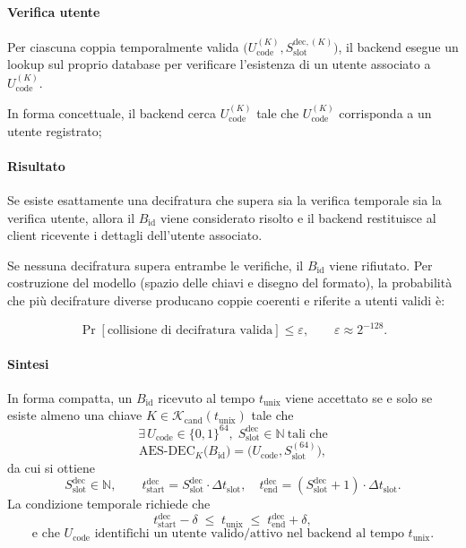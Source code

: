 \documentclass[a4paper,11pt]{article}
\begin{document}
\paragraph{Verifica utente}
Per ciascuna coppia temporalmente valida \(\bigl(U_{\text{code}}^{(K)}, S_{\text{slot}}^{\text{dec},(K)}\bigr)\), il backend esegue un lookup sul proprio database
per verificare l'esistenza di un utente associato a \(U_{\text{code}}^{(K)}\).

In forma concettuale, il backend cerca \(U_{\text{code}}^{(K)}\) tale che \(U_{\text{code}}^{(K)}\) corrisponda a un utente registrato;

\paragraph{Risultato}
Se esiste esattamente una decifratura che supera sia la verifica temporale sia la verifica utente, allora il \(B_{\text{id}}\) viene considerato
risolto e il backend restituisce al client ricevente i dettagli dell'utente associato.

Se nessuna decifratura supera entrambe le verifiche, il \(B_{\text{id}}\) viene rifiutato. Per costruzione del modello (spazio delle chiavi e
disegno del formato), la probabilità che più decifrature diverse producano coppie coerenti e riferite a utenti validi è:

\[
  \Pr[\text{collisione di decifratura valida}] \le \varepsilon,
  \qquad \varepsilon \approx 2^{-128}.
\]

\paragraph{Sintesi}
In forma compatta, un \(B_{\text{id}}\) ricevuto al tempo \(t_{\text{unix}}\) viene accettato se e solo se
esiste almeno una chiave \(K \in \mathcal{K}_{\mathrm{cand}}(t_{\text{unix}})\) tale che
\[
  \exists\, U_{\text{code}} \in \{0,1\}^{64},\;
  S_{\text{slot}}^{\text{dec}} \in \mathbb{N} \ \text{tali che}
\]
\[
  \mathrm{AES\text{-}DEC}_{K}\bigl(B_{\text{id}}\bigr)
  = \bigl(U_{\text{code}}, S_{\text{slot}}^{(64)}\bigr),
\]
da cui si ottiene
\[
  S_{\text{slot}}^{\text{dec}} \in \mathbb{N}, \qquad
  t_{\text{start}}^{\text{dec}} =
  S_{\text{slot}}^{\text{dec}} \cdot \Delta t_{\text{slot}}, \quad
  t_{\text{end}}^{\text{dec}} =
  (S_{\text{slot}}^{\text{dec}} + 1) \cdot \Delta t_{\text{slot}}.
\]
La condizione temporale richiede che
\[
  t_{\text{start}}^{\text{dec}} - \delta
  \;\le\;
  t_{\text{unix}}
  \;\le\;
  t_{\text{end}}^{\text{dec}} + \delta,
\]
\[
  \text{e che \(U_{\text{code}\!}\) identifichi un utente valido/attivo nel backend al tempo } t_{\text{unix}}.
\]
\end{document}
